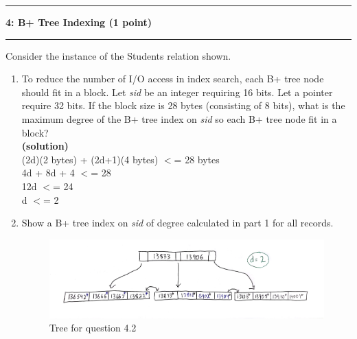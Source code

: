 \documentclass[11pt]{article}
\newcommand\question[2]{\vspace{.25in}\hrule\textbf{#1: #2}\vspace{.5em}\hrule\vspace{.10in}}
\renewcommand\part[1]{\vspace{.10in}\textbf{(#1)}}
\begin{document}
\begin{enumerate}
\end{enumerate}


\question{4}{B+ Tree Indexing (1 point)}
Consider the instance of the Students relation shown.
\begin{enumerate}

	\item To reduce the number of I/O access in index search, each B+ tree node should fit in a block. Let {\it sid} be an integer requiring 16 bits. Let a pointer require 32 bits.
	If the block size is 28 bytes (consisting of 8 bits), what is the maximum degree of the B+ tree index on {\it sid} so each B+ tree node fit in a block?\\
	\part{solution}\\
	(2d)(2 bytes) + (2d+1)(4 bytes) $<$= 28 bytes \\
	4d + 8d + 4 $<$= 28 \\
	12d $<$= 24 \\
	d $<$= 2 \\


	\item Show a B+ tree index on {\it sid} of degree calculated in part 1 for all records.

	\begin{figure}[H]
		\centering
		\includegraphics[width=0.9\columnwidth]{figure_q4_2.png}
		\caption{Tree for question 4.2}
		\label{figure:q4_2}
	\end{figure}




\end{enumerate}
\end{document}
